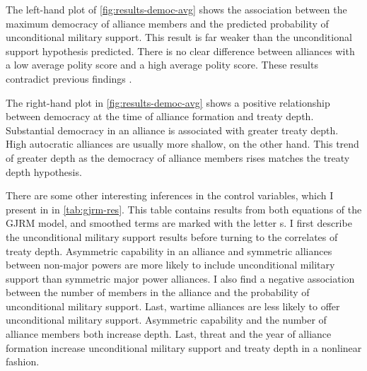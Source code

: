 \documentclass[12pt]{article}
\begin{document}
The left-hand plot of \autoref{fig:results-democ-avg} shows the association between the maximum democracy of alliance members and the predicted probability of unconditional military support. 
This result is far weaker than the unconditional support hypothesis predicted.  
There is no clear difference between alliances with a low average polity score and a high average polity score. 
These results contradict previous findings \citep{Mattes2012, Chibaetal2015}.


The right-hand plot in \autoref{fig:results-democ-avg} shows a positive relationship between democracy at the time of alliance formation and treaty depth.
Substantial democracy in an alliance is associated with greater treaty depth. 
High autocratic alliances are usually more shallow, on the other hand. 
This trend of greater depth as the democracy of alliance members rises matches the treaty depth hypothesis. 


There are some other interesting inferences in the control variables, which I present in in \autoref{tab:gjrm-res}. 
This table contains results from both equations of the GJRM model, and smoothed terms are marked with the letter s. 
I first describe the unconditional military support results before turning to the correlates of treaty depth. 
Asymmetric capability in an alliance and symmetric alliances between non-major powers are more likely to include unconditional military support than symmetric major power alliances. 
I also find a negative association between the number of members in the alliance and the probability of unconditional military support. 
Last, wartime alliances are less likely to offer unconditional military support.  
Asymmetric capability and the number of alliance members both increase depth. 
Last, threat and the year of alliance formation increase unconditional military support and treaty depth in a nonlinear fashion. 
\end{document}
